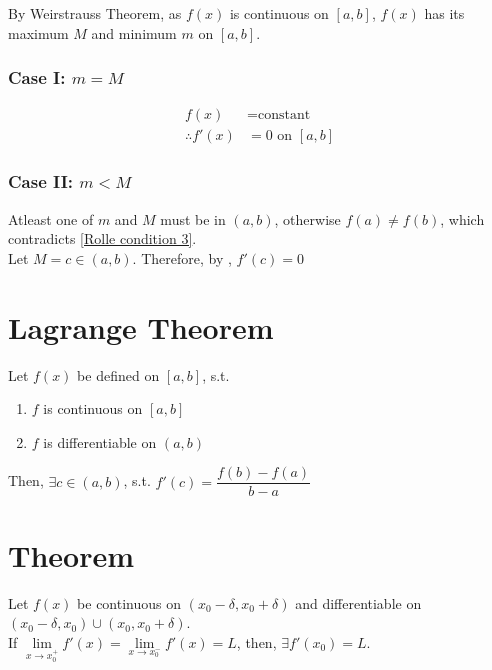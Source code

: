 \documentclass[fleqn]{article}
\begin{document}
By Weirstrauss Theorem, as $f(x)$ is continuous on $[a, b]$, $f(x)$ has its maximum $M$ and minimum $m$ on $[a, b]$. 

\subsubsection*{Case I: $m = M$}

\begin{align*}
	f(x) &= \text{constant} \\
	\therefore f'(x) &= 0 \text{ on } [a, b]
\end{align*}

\subsubsection*{Case II: $m < M$}

Atleast one of $m$ and $M$ must be in $(a, b)$, otherwise $f(a) \neq f(b)$, which contradicts \eqref{Rolle condition 3}.\\
Let $M = c \in (a, b)$. Therefore, by , $f'(c) = 0$

\section{Lagrange Theorem}

Let $f(x)$ be defined on $[a, b]$, s.t. 
\begin{enumerate}[(1)]
	\item $f$ is continuous on $[a, b]$
	\item $f$ is differentiable on $(a, b)$
\end{enumerate}
Then, $\exists c \in (a, b)$, s.t. $f'(c) = \dfrac{f(b) - f(a)}{b - a}$

\section{Theorem}

Let $f(x)$ be continuous on $(x_0 - \delta, x_0 + \delta)$ and differentiable on $(x_0 - \delta, x_0) \cup (x_0, x_0 + \delta)$.\\
If $\lim\limits_{x \rightarrow x_0^+} f'(x) = \lim\limits_{x \rightarrow x_0^-} f'(x) = L$, then, $\exists f'(x_0) = L$.
\end{document}
